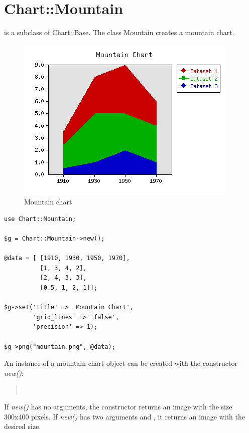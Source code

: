%
%
\section{Chart::Mountain}
\begin{Description} 
 is a subclass of Chart::Base.
The class Mountain creates a mountain chart.
\end{Description}

\begin{figure}[h]
	\begin{center}
		\includegraphics[scale =0.6]{mountain.png}
	\end{center}
	\caption{Mountain chart}
	\label{fig:mountain}
\end{figure}
\begin{verbatim}
use Chart::Mountain;

$g = Chart::Mountain->new();

@data = [ [1910, 1930, 1950, 1970],
          [1, 3, 4, 2],
          [2, 4, 3, 3],
          [0.5, 1, 2, 1]];

$g->set('title' => 'Mountain Chart',
        'grid_lines' => 'false',
        'precision' => 1);

$g->png("mountain.png", @data);
\end{verbatim}

\begin{Constructor} 
An instance of a mountain chart object can be created with the constructor \textit{new()}:
\begin{quote}
\\
\end{quote}
If \textit{new()} has no arguments, 
the constructor returns an image with the size 300x400 pixels. If \textit{new()} 
has two arguments  and , 
it returns an image with the desired size.
\end{Constructor}


